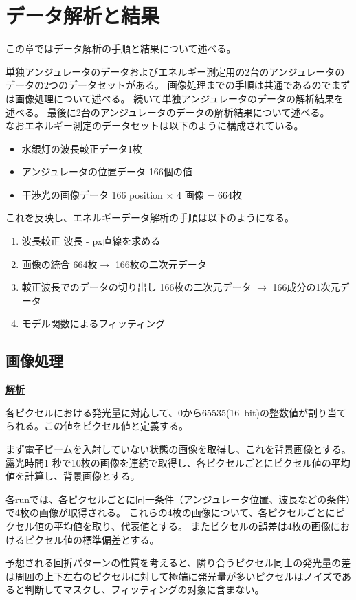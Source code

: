 \documentclass[a4paper,11pt,uplatex]{jsbook}
\begin{document}
\chapter{データ解析と結果}
この章ではデータ解析の手順と結果について述べる。

単独アンジュレータのデータおよびエネルギー測定用の2台のアンジュレータのデータの2つのデータセットがある。
画像処理までの手順は共通であるのでまずは画像処理について述べる。
続いて単独アンジュレータのデータの解析結果を述べる。
最後に2台のアンジュレータのデータの解析結果について述べる。\\
なおエネルギー測定のデータセットは以下のように構成されている。
\begin{itemize}
  \item 水銀灯の波長較正データ1枚
  \item アンジュレータの位置データ 166個の値
  \item 干渉光の画像データ 166 position $\times$ 4 画像 = 664枚
\end{itemize}
これを反映し、エネルギーデータ解析の手順は以下のようになる。
\begin{enumerate}
  \item 波長較正 波長 - px直線を求める
  \item 画像の統合 664枚$\rightarrow$ 166枚の二次元データ
  \item 較正波長でのデータの切り出し 166枚の二次元データ $\rightarrow$ 166成分の1次元データ
  \item モデル関数によるフィッティング
\end{enumerate}

\section{画像処理}
\noindent \textbf{\underline{解析}}\par
各ピクセルにおける発光量に対応して、0から65535(16~bit)の整数値が割り当てられる。この値をピクセル値と定義する。

まず電子ビームを入射していない状態の画像を取得し、これを背景画像とする。露光時間1 秒で10枚の画像を連続で取得し、各ピクセルごとにピクセル値の平均値を計算し、背景画像とする。

各runでは、各ピクセルごとに同一条件（アンジュレータ位置、波長などの条件）で4枚の画像が取得される。
これらの4枚の画像について、各ピクセルごとにピクセル値の平均値を取り、代表値とする。
またピクセルの誤差は4枚の画像におけるピクセル値の標準偏差とする。

予想される回折パターンの性質を考えると、隣り合うピクセル同士の発光量の差は周囲の上下左右のピクセルに対して極端に発光量が多いピクセルはノイズであると判断してマスクし、フィッティングの対象に含まない。
\end{document}
